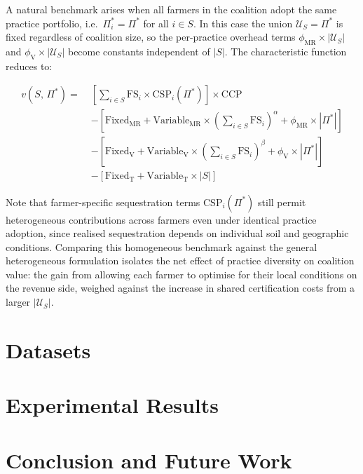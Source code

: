 \documentclass[manuscript, screen]{acmart}
\begin{document}
A natural benchmark arises when all farmers in the coalition adopt the same
practice portfolio, i.e.\ $\Pi_i^* = \Pi^*$ for all $i \in S$. In this
case the union $\mathcal{U}_S = \Pi^*$ is fixed regardless of coalition size,
so the per-practice overhead terms $\phi_{\text{MR}} \times |\mathcal{U}_S|$
and $\phi_{\text{V}} \times |\mathcal{U}_S|$ become constants independent of
$|S|$. The characteristic function reduces to:

\begin{equation}
\begin{split}
v(S,\, \Pi^*) = \;
    & \left[\sum_{i \in S} \text{FS}_i \times \text{CSP}_i(\Pi^*)\right] \times \text{CCP} \\
    & - \left[\text{Fixed}_{\text{MR}} + \text{Variable}_{\text{MR}}
        \times \left(\sum_{i \in S} \text{FS}_i\right)^{\!\alpha}
        + \phi_{\text{MR}} \times |\Pi^*|\right] \\
    & - \left[\text{Fixed}_{\text{V}} + \text{Variable}_{\text{V}}
        \times \left(\sum_{i \in S} \text{FS}_i\right)^{\!\beta}
        + \phi_{\text{V}} \times |\Pi^*|\right] \\
    & - \left[\text{Fixed}_{\text{T}} + \text{Variable}_{\text{T}} \times |S|\right]
\end{split}
\end{equation}

Note that farmer-specific sequestration terms $\text{CSP}_i(\Pi^*)$ still
permit heterogeneous contributions across farmers even under identical practice
adoption, since realised sequestration depends on individual soil and
geographic conditions. Comparing this homogeneous benchmark against the general
heterogeneous formulation isolates the net effect of practice diversity on
coalition value: the gain from allowing each farmer to optimise for their local
conditions on the revenue side, weighed against the increase in shared
certification costs from a larger $|\mathcal{U}_S|$.



\section{Datasets}
\section{Experimental Results}
\section{Conclusion and Future Work}
\end{document}
